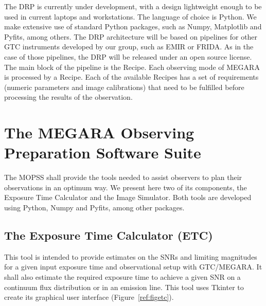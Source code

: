 The DRP is currently under development, with a design lightweight enough to be used in current laptops and workstations. The language of choice is Python. We make extensive use of standard Python packages, such as Numpy, Matplotlib and Pyfits, among others. The DRP architecture will be based on pipelines for other GTC instruments developed by our group, such as EMIR or FRIDA. As in the case of those pipelines, the DRP will be released under an open source license. The main block of the pipeline is the Recipe. Each observing mode of MEGARA is processed by a Recipe. Each of the available Recipes has a set of requirements (numeric parameters and image calibrations) that need to be fulfilled before processing the results of the observation. 

\section{The MEGARA Observing Preparation Software Suite}
The MOPSS shall provide the tools needed to assist observers to plan their observations in an optimum way. We present here two of its components, the Exposure Time Calculator and the Image Simulator. Both tools are developed using Python, Numpy and Pyfits, among other packages.

\subsection{The Exposure Time Calculator (ETC)}

This tool is intended to provide estimates on the SNRs and limiting magnitudes for a given input exposure time and observational setup with GTC/MEGARA. It shall also estimate the required exposure time to achieve a given SNR on a continuum flux distribution or in an emission line. This tool uses Tkinter to create its graphical user interface (Figure~\ref{ref:figetc}).

